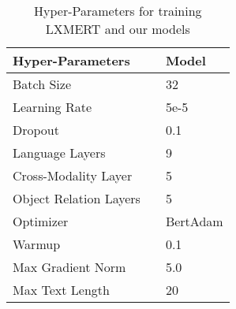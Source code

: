 \begin{table}
    \centering
    \begin{tabular}{lcl}
        \toprule
        \textbf{Hyper-Parameters } & \hphantom & \textbf{Model} \\ 
        \toprule
        Batch Size             && 32                         \\ 
        Learning Rate          && 5e-5                       \\ 
        Dropout                && 0.1                        \\ 
        Language Layers        && 9                          \\ 
        Cross-Modality Layer   && 5                          \\ 
        Object Relation Layers && 5                          \\ 
        Optimizer              && BertAdam                   \\ 
        Warmup                 && 0.1                        \\ 
        Max Gradient Norm      && 5.0                        \\ 
        Max Text Length    && 20                         \\ 
        \bottomrule
    \end{tabular}
    \caption{Hyper-Parameters for training LXMERT and our models}
    \label{tab:hyper}
\end{table}